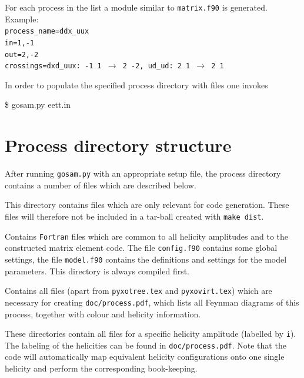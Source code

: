 \documentclass[11pt,a4paper]{refrep}
\begin{document}
\begin{enumerate}
    For each process in the list a module similar to {\tt matrix.f90} is  generated.  
    Example: \\                                                 
    {\tt process\_name=ddx\_uux }\\                                           
    {\tt in=1,-1 }\\                                                          
    {\tt out=2,-2  }\\                                                       
    {\tt crossings=dxd\_uux: -1 1 $\to$ 2 -2, ud\_ud: 2 1 $\to$ 2 1  }    
\end{enumerate}



In order to populate the specified process directory with files
one invokes
\begin{example}
\$ gosam.py eett.in
\end{example}

\section{Process directory structure}



After running \texttt{gosam.py} with an appropriate setup file, the
process directory contains a number of files which are described below.

 This directory contains files which are only
relevant for code ge\-ne\-ration. These files will therefore not be included
in a tar-ball created with \texttt{make dist}.

 Contains {\tt Fortran} files which are common to all helicity
amplitudes and to the constructed matrix element code. 
The file {\tt config.f90} contains some global  settings, the file {\tt model.f90}
contains the definitions and settings for the model parameters.
This directory is always compiled first.

 Contains all files (apart from
\texttt{pyxotree.tex} and \texttt{pyxovirt.tex}) which are
necessary for creating
\texttt{doc/process.pdf}, which lists all Feynman diagrams of this process, 
together with colour and helicity information.

 These directories contain all files for a specific
helicity amplitude (labelled by {\tt i}). The labeling of the helicities can be found in
\texttt{doc/process.pdf}. 
Note that the code will automatically map equivalent helicity 
configurations onto one single helicity and perform the corresponding book-keeping.
\end{document}
